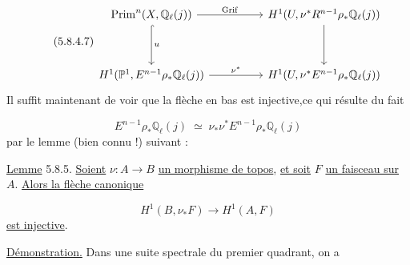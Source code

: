 \begin{equation}\tag{5.8.4.7}
\begin{tikzcd}[column sep=huge, row sep=huge]
\mathrm{Prim}^n(X,\mathbb{Q}_\ell(j)) \arrow[r, "\mathrm{Grif}"] \arrow[d, hook, "u"] & H^1(U,\nu^*R^{n-1}\rho_*\mathbb{Q}_\ell(j)) \arrow[d] \\
H^1(\mathbb{P}^1,E^{n-1}\rho_*\mathbb{Q}_\ell(j)) \arrow[r, "\nu^*"] & H^1(U,\nu^*E^{n-1}\rho_*\mathbb{Q}_\ell(j))
\end{tikzcd}
\end{equation}
Il suffit maintenant de voir que la flèche en bas est injective,ce qui résulte du fait

\begin{equation}\tag{5.8.4.8}
E^{n-1}\rho_*\mathbb{Q}_\ell(j) \;\simeq\; \nu_*\nu^*E^{n-1}\rho_*\mathbb{Q}_\ell(j)
\end{equation}
par le lemme (bien connu !) suivant :

\underline{Lemme} 5.8.5. \underline{Soient} $\nu : A \longrightarrow B$ \underline{un morphisme de topos}, \underline{et soit} $F$ \underline{un faisceau sur} $A$. \underline{Alors la flèche canonique}

\begin{equation}\tag{5.8.5.1}
H^1(B,\nu_*F) \longrightarrow H^1(A,F)
\end{equation}
\underline{est injective}.

\underline{Démonstration.} Dans une suite spectrale du premier quadrant, on a

